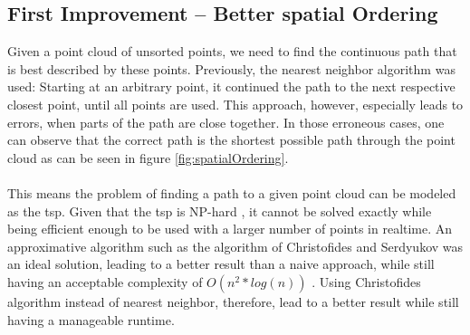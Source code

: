 \subsection{First Improvement – Better spatial Ordering}
Given a point cloud of unsorted points, we need to find the continuous path that is best described by these points. Previously, the nearest neighbor algorithm was used: Starting at an arbitrary point, it continued the path to the next respective closest point, until all points are used. This approach, however, especially leads to errors, when parts of the path are close together. In those erroneous cases, one can observe that the correct path is the shortest possible path through the point cloud as can be seen in figure \ref{fig:spatialOrdering}.\\
\\
This means the problem of finding a path to a given point cloud can be modeled as the \ac{tsp}. Given that the \ac{tsp} is NP-hard \cite{Korte2008}, it cannot be solved exactly while being efficient enough to be used with a larger number of points in realtime. An approximative algorithm such as the algorithm of Christofides and Serdyukov was an ideal solution, leading to a better result than a naive approach, while still having an acceptable complexity of $O(n^2 * log(n))$ \cite{Christofides2022}. Using Christofides algorithm instead of nearest neighbor, therefore, lead to a better result while still having a manageable runtime. 


